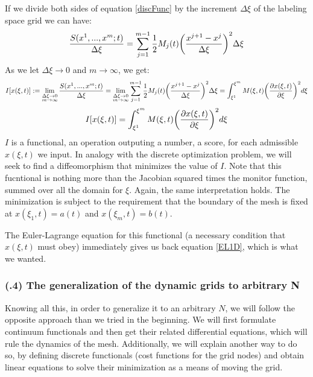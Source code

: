 \documentclass[11pt, a4paper]{article} %
\begin{document}
If we divide both sides of equation \eqref{discFunc} by the increment $\Delta \xi$ of the labeling space grid we can have:
\begin{equation}
\frac{S( x^1,...,x^m;t)}{\Delta\xi}=\sum_{j=1}^{m-1} \frac{1}{2} M_j(t) \qty(\frac{x^{j+1}-x^j}{\Delta \xi})^2 \Delta \xi
\end{equation}
As we let $\Delta \xi \rightarrow 0$ and $m\rightarrow \infty$, we get:
\begin{equation}
I[x(\xi,t)]:=\lim\limits_{\substack{\Delta \xi \rightarrow 0\\ m \rightarrow \infty}}\frac{S( x^1,...,x^m;t)}{\Delta\xi}=\lim\limits_{\substack{\Delta \xi \rightarrow 0\\ m \rightarrow \infty}} \sum_{j=1}^{m-1}\frac{1}{2} M_j(t) \qty(\frac{x^{j+1}-x^j}{\Delta \xi})^2 \Delta \xi=\int_{\xi^1}^{\xi^m} M(\xi,t) \qty(\pdv{x(\xi,t)}{\xi})^2d\xi
\end{equation}
\begin{equation}\label{functional1D}
I[x(\xi,t)]=\int_{\xi^1}^{\xi^m} M(\xi,t) \qty(\pdv{x(\xi,t)}{\xi})^2d\xi
\end{equation}
$I$ is a functional, an operation outputing a number, a score, for each admissible $x(\xi,t)$ we input. In analogy with the discrete optimization problem, we will seek to find a diffeomorphism that minimizes the value of $I$. Note that this fucntional is nothing more than the Jacobian squared times the monitor function, summed over all the domain for $\xi$. Again, the same interpretation holds. The minimization is subject to the requirement that the boundary of the mesh is fixed at $x(\xi_1,t)=a(t)$ and $x(\xi_m,t)=b(t)$.

The Euler-Lagrange equation for this functional (a necessary condition that $x(\xi,t)$ must obey) immediately gives us back equation \eqref{EL1D}, which is what we wanted.

\subsubsection*{\bf (\textgamma.4) The generalization of the dynamic grids to arbitrary N}

Knowing all this, in order to generalize it to an arbitrary $N$, we will follow the opposite approach than we tried in the beginning. We will first formulate continuum functionals and then get their related differential equations, which will rule the dynamics of the mesh. Additionally, we will explain another way to do so, by defining discrete functionals (cost functions for the grid nodes) and obtain linear equations to solve their minimization as a means of moving the grid.
\end{document}
